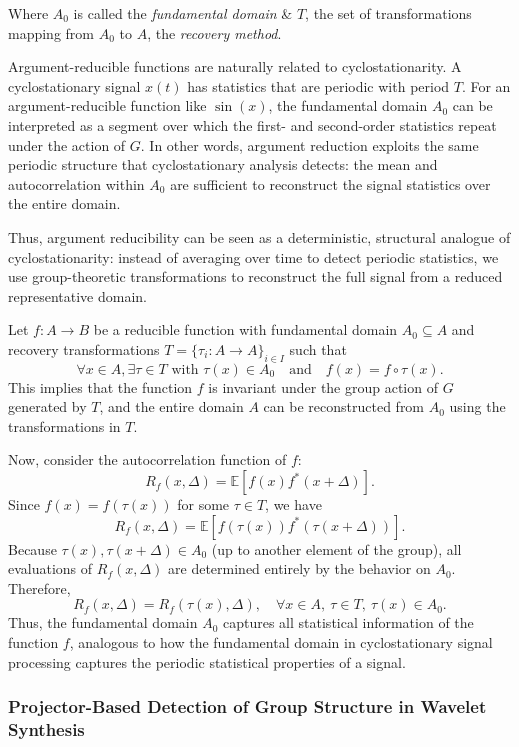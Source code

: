 Where $A_0$ is called the \textit{fundamental domain} \& $T$, the set of transformations mapping from $A_0$ to $A$, the \textit{recovery method}.
\medskip

\noindent Argument-reducible functions are naturally related to cyclostationarity. A cyclostationary signal $x(t)$ has statistics that are periodic with period $T$.
For an argument-reducible function like $\sin(x)$, the fundamental domain $A_0$ can be interpreted as a segment over which the first- and second-order statistics repeat under the action of $G$. In other words, argument reduction exploits the same periodic structure that cyclostationary analysis detects: the mean and autocorrelation within $A_0$ are sufficient to reconstruct the signal statistics over the entire domain.
\medskip

\noindent Thus, argument reducibility can be seen as a deterministic, structural analogue of cyclostationarity: instead of averaging over time to detect periodic statistics, we use group-theoretic transformations to reconstruct the full signal from a reduced representative domain.
\bigskip

\noindent Let \( f: A \to B \) be a reducible function with fundamental domain \( A_0 \subseteq A \) and recovery transformations \( T = \{ \tau_i : A \to A \}_{i \in I} \) such that
\[
\forall x \in A, \exists \tau \in T \text{ with } \tau(x) \in A_0 \quad \text{and} \quad f(x) = f \circ \tau(x).
\]
This implies that the function \( f \) is invariant under the group action of \( G \) generated by \( T \), and the entire domain \( A \) can be reconstructed from \( A_0 \) using the transformations in \( T \).
\medskip

\noindent Now, consider the autocorrelation function of \( f \):
\[
R_f(x, \Delta) = \mathbb{E}[f(x) f^*(x + \Delta)].
\]
Since \( f(x) = f(\tau(x)) \) for some \( \tau \in T \), we have
\[
R_f(x, \Delta) = \mathbb{E}[f(\tau(x)) f^*(\tau(x + \Delta))].
\]
Because \( \tau(x), \tau(x + \Delta) \in A_0 \) (up to another element of the group), all evaluations of \( R_f(x, \Delta) \) are determined entirely by the behavior on \( A_0 \). Therefore,
\[
R_f(x, \Delta) = R_f(\tau(x), \Delta), \quad \forall x \in A, \ \tau \in T, \ \tau(x) \in A_0.
\]
Thus, the fundamental domain \( A_0 \) captures all statistical information of the function \( f \), analogous to how the fundamental domain in cyclostationary signal processing captures the periodic statistical properties of a signal.

\subsubsection{Projector-Based Detection of Group Structure in Wavelet Synthesis}

